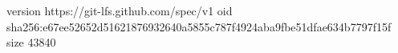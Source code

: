 version https://git-lfs.github.com/spec/v1
oid sha256:e67ee52652d51621876932640a5855c787f4924aba9fbe51dfae634b7797f15f
size 43840
